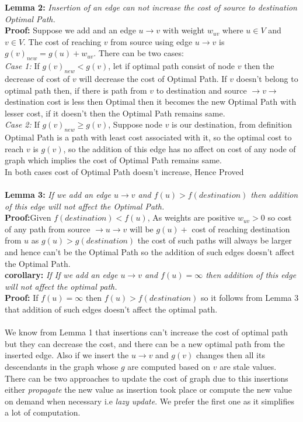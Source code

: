 \documentclass[a4paper]{article}
\begin{document}
\textbf{Lemma 2:} \textit{Insertion of an edge can not increase the cost of source to destination Optimal Path.}\\
\textbf{Proof:} Suppose we add and an edge $u \rightarrow v $ with weight $w_{uv}$ where $u \in V$ and $v \in V$. The cost of reaching $v$ from source using edge $u \rightarrow v$ is $g(v)_{new} = g(u) + w_{uv}$. There can be two cases:\\
\textit{Case 1:} If $g(v)_{new} < g(v)$, let if optimal path consist of node $v$ then the decrease of cost of $v$ will decrease the cost of Optimal Path. If $v$ doesn't belong to optimal path then, if there is path from $v$ to destination and source $\rightarrow v \rightarrow$ destination cost is less then Optimal then it becomes the new Optimal Path with lesser cost, if it doesn't then the Optimal Path remains same.\\
\textit{Case 2:} If $g(v)_{new} \geq g(v)$,  Suppose node $v$ is our destination, from definition Optimal Path is a path with least cost associated with it, so the optimal cost to reach $v$ is $g(v)$, so the addition of this edge has no affect on cost of any node of graph which implies the cost of Optimal Path remains same.\\
In both cases cost of Optimal Path doesn't increase, Hence Proved\\
\\
\textbf{Lemma 3:} \textit{If we add an edge $u \rightarrow v$ and $f(u) > f(destination)$ then addition of this edge will not affect the Optimal Path.}\\
\textbf{Proof:}Given  $f(destination) < f(u)$, As weights are positive $w_{uv} > 0$ so  cost of any path from source $\rightarrow u \rightarrow v$ will be $g(u) + $ cost of reaching destination from $u$ as $g(u) > g(destination)$ the cost of such paths will always be larger and hence can't be the Optimal Path so the addition of such edges doesn't affect the Optimal Path.\\   
\textbf{corollary:} \textit{If If we add an edge $u \rightarrow v$ and $f(u) = \infty$ then addition of this edge will not affect the optimal path.}\\
\textbf{Proof:} If $f(u) = \infty$ then $f(u) > f(destination)$ so it follows from Lemma 3 that addition of such edges doesn't affect the optimal path.\\
\\
We know from Lemma 1 that insertions can't increase the cost of optimal path but they can decrease the cost, and there can be a new optimal path from the inserted edge. Also if we insert the $u \rightarrow v$ and $g(v)$ changes then all its descendants in the graph whose $g$ are computed based on $v$ are stale values. There can be two approaches to update the cost of graph due to this insertions either \textit{propagate} the new value as insertion took place or compute the new value on demand when necessary i.e \textit{lazy update}. We prefer the first one as it simplifies a lot of computation.\\
\end{document}
